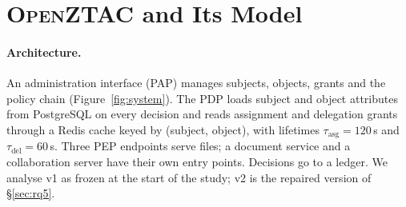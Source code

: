 \documentclass[sigconf,review,anonymous]{acmart}
\newcommand{\sysname}{\textsc{OpenZTAC}\xspace}
\newcommand{\sysname}{\textsc{Atrium}\xspace}
\newcommand{\sysname}{\textsc{OpenZTAC}\xspace}
\begin{document}
\section{\sysname and Its Model}
\label{sec:system}

\paragraph{Architecture.} An administration interface (PAP) manages subjects, objects, grants and the policy chain
(Figure~\ref{fig:system}). The PDP loads subject and object attributes from PostgreSQL on every decision and reads
assignment and delegation grants through a Redis cache keyed by (subject, object), with lifetimes
$\tau_{\mathrm{asg}}=120$\,s and $\tau_{\mathrm{del}}=60$\,s. Three PEP endpoints serve files; a document service
and a collaboration server have their own entry points. Decisions go to a ledger. We analyse v1 as frozen at the
start of the study; v2 is the repaired version of \S\ref{sec:rq5}.
\end{document}
